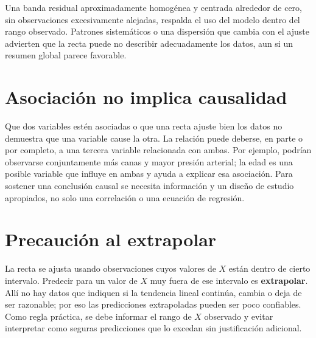 Una banda residual aproximadamente homogénea y centrada alrededor de cero, sin observaciones excesivamente alejadas, respalda el uso del modelo dentro del rango observado. Patrones sistemáticos o una dispersión que cambia con el ajuste advierten que la recta puede no describir adecuadamente los datos, aun si un resumen global parece favorable.

\section{Asociación no implica causalidad}

Que dos variables estén asociadas o que una recta ajuste bien los datos no demuestra que una variable cause la otra. La relación puede deberse, en parte o por completo, a una tercera variable relacionada con ambas. Por ejemplo, podrían observarse conjuntamente más canas y mayor presión arterial; la edad es una posible variable que influye en ambas y ayuda a explicar esa asociación. Para sostener una conclusión causal se necesita información y un diseño de estudio apropiados, no solo una correlación o una ecuación de regresión.

\section{Precaución al extrapolar}

La recta se ajusta usando observaciones cuyos valores de $X$ están dentro de cierto intervalo. Predecir para un valor de $X$ muy fuera de ese intervalo es \textbf{extrapolar}. Allí no hay datos que indiquen si la tendencia lineal continúa, cambia o deja de ser razonable; por eso las predicciones extrapoladas pueden ser poco confiables. Como regla práctica, se debe informar el rango de $X$ observado y evitar interpretar como seguras predicciones que lo excedan sin justificación adicional.